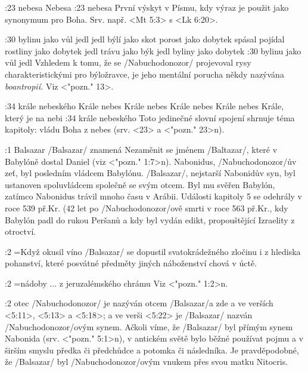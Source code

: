 :23
    {nebesa}   %
    {}   %
    {}   %
    {Nebesa}   %
    {}   %
    {}   %
:23 {nebesa}  První výskyt v Písmu, kdy výraz  je použit jako synonymum pro Boha. Srv. např.  <Mt 5:3> s <Lk 6:20>.

:30
    {bylinu jako vůl jedl}   %
    {jedl býlí jako skot}   %
    {porost jako dobytek spásal}   %
    {pojídal rostliny jako dobytek}   %
    {jedl trávu jako býk}   %
    {jedl byliny jako dobytek}   %
:30 {bylinu jako vůl jedl}
     Vzhledem k tomu, že  se \x/Nabuchodonozor/ projevoval rysy charakteristickými pro býložravce, je jeho mentální porucha někdy nazývána {\em boantropií.} Viz <"pozn." 13>.

:34  
    {krále nebeského}   %
    {Krále nebes}   %
    {Krále nebes}   %
    {Krále nebes}   %
    {Krále nebes}   %
    {Krále, který je na nebi}   %
:34 {krále nebeského} Toto jedinečné slovní spojení shrnuje téma kapitoly: vládu Boha z nebes (srv. <23> a <"pozn." 23>n). 


:1 {Balsazar}
     \x/Balsazar/ znamená  
     Nezaměnit se jménem \x/Baltazar/, které v Babylóně dostal Daniel (viz <"pozn." 1:7>n). 
     Nabonidus, \x/Nabuchodonozor/ův zeť, byl posledním vládcem Babylónu. 
     \x/Balsazar/, nejstarší Nabonidův syn, byl ustanoven spoluvládcem společně se svým otcem.
     Byl mu svěřen Babylón, zatímco Nabonidus trávil mnoho času v Arábii.
     Události kapitoly 5 se odehrály v roce 539 př.Kr. (42 let po \x/Nabuchodonozor/ově
     smrti v roce 563 př.Kr., kdy Babylón padl do rukou Peršanů a kdy byl vydán
     edikt, propouštějící Izraelity z otroctví. 
     
     
:2 {}={Když okusil víno}  \x/Balsazar/ se dopustil svatokrádežného zločinu i z hlediska pohanství, které   posvátné předměty jiných náboženství chová v úctě.

:2 {}={nádoby ... z jeruzalémského chrámu} Viz  <"pozn." 1:2>n. 
     
:2 {otec}  \x/Nabuchodonozor/ je nazýván otcem \x/Balsazar/a zde a ve verších 
<5:11>, <5:13> a <5:18>; a ve verši <5:22> je \x/Balsazar/ nazván \x/Nabuchodonozor/ovým synem.
Ačkoli víme, že \x/Balsazar/ byl přímým synem Nabonida  (srv. <"pozn." 5:1>n), v antickém světě bylo běžné používat pojmu  a  v širším smyslu předka či předchůdce a potomka či následníka. Je pravděpodobné, že \x/Balsazar/ byl \x/Nabuchodonozor/ovým vnukem přes svou matku Nitocris.
     
